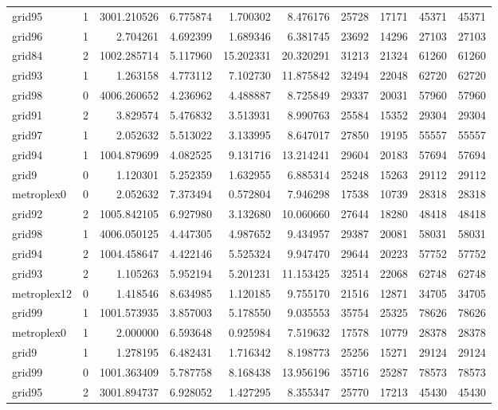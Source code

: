 \begin{longtable}{|l|r|r|r|r|r|r|r|r|r|}
grid95 & 1 & 3001.210526 & 6.775874 & 1.700302 & 8.476176 & 25728 & 17171 & 45371 & 45371 \\
grid96 & 1 & 2.704261 & 4.692399 & 1.689346 & 6.381745 & 23692 & 14296 & 27103 & 27103 \\
grid84 & 2 & 1002.285714 & 5.117960 & 15.202331 & 20.320291 & 31213 & 21324 & 61260 & 61260 \\
grid93 & 1 & 1.263158 & 4.773112 & 7.102730 & 11.875842 & 32494 & 22048 & 62720 & 62720 \\
grid98 & 0 & 4006.260652 & 4.236962 & 4.488887 & 8.725849 & 29337 & 20031 & 57960 & 57960 \\
grid91 & 2 & 3.829574 & 5.476832 & 3.513931 & 8.990763 & 25584 & 15352 & 29304 & 29304 \\
grid97 & 1 & 2.052632 & 5.513022 & 3.133995 & 8.647017 & 27850 & 19195 & 55557 & 55557 \\
grid94 & 1 & 1004.879699 & 4.082525 & 9.131716 & 13.214241 & 29604 & 20183 & 57694 & 57694 \\
grid9 & 0 & 1.120301 & 5.252359 & 1.632955 & 6.885314 & 25248 & 15263 & 29112 & 29112 \\
metroplex0 & 0 & 2.052632 & 7.373494 & 0.572804 & 7.946298 & 17538 & 10739 & 28318 & 28318 \\
grid92 & 2 & 1005.842105 & 6.927980 & 3.132680 & 10.060660 & 27644 & 18280 & 48418 & 48418 \\
grid98 & 1 & 4006.050125 & 4.447305 & 4.987652 & 9.434957 & 29387 & 20081 & 58031 & 58031 \\
grid94 & 2 & 1004.458647 & 4.422146 & 5.525324 & 9.947470 & 29644 & 20223 & 57752 & 57752 \\
grid93 & 2 & 1.105263 & 5.952194 & 5.201231 & 11.153425 & 32514 & 22068 & 62748 & 62748 \\
metroplex12 & 0 & 1.418546 & 8.634985 & 1.120185 & 9.755170 & 21516 & 12871 & 34705 & 34705 \\
grid99 & 1 & 1001.573935 & 3.857003 & 5.178550 & 9.035553 & 35754 & 25325 & 78626 & 78626 \\
metroplex0 & 1 & 2.000000 & 6.593648 & 0.925984 & 7.519632 & 17578 & 10779 & 28378 & 28378 \\
grid9 & 1 & 1.278195 & 6.482431 & 1.716342 & 8.198773 & 25256 & 15271 & 29124 & 29124 \\
grid99 & 0 & 1001.363409 & 5.787758 & 8.168438 & 13.956196 & 35716 & 25287 & 78573 & 78573 \\
grid95 & 2 & 3001.894737 & 6.928052 & 1.427295 & 8.355347 & 25770 & 17213 & 45430 & 45430 \\

\end{longtable}
